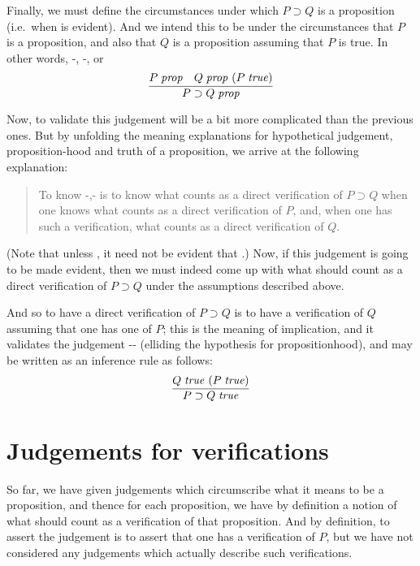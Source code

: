 \documentclass[main.tex]{subfiles}
\begin{document}
Finally, we must define the circumstances under which $P\supset Q$ is a
proposition (i.e.\ when  is evident). And we intend this to
be under the circumstances that $P$ is a proposition, and also that $Q$ is a
proposition assuming that $P$ is true. In other words, \hyp{}{, \hyp{}{}}, or
\[
  \infer{
    \isprop{P\supset Q}
  }{
    \isprop{P} &
    \hyp{\isprop{Q}}{\istrue{P}}
  }
\]

Now, to validate this judgement will be a bit more complicated than the
previous ones. But by unfolding the meaning explanations for hypothetical
judgement, proposition-hood and truth of a proposition, we arrive at the
following explanation:
\begin{quote}
  To know \hyp{}{,\hyp{}{}} is
  to know what counts as a direct verification of $P\supset Q$ when one knows what
  counts as a direct verification of $P$, and, when one has such a verification, what
  counts as a direct verification of $Q$.
\end{quote}

(Note that unless , it need not be evident that .) Now, if
this judgement is going to be made evident, then we must indeed come up with
what should count as a direct verification of $P\supset Q$ under the
assumptions described above.

And so to have a direct verification of $P\supset Q$ is to have a
verification of $Q$ assuming that one has one of $P$; this is the meaning of
implication, and it validates the judgement \hyp{}{\hyp{}{}} (elliding the hypothesis for
propositionhood), and may be written as an inference rule as follows:
\[
  \infer{
    \istrue{P\supset Q}
  }{
    \hyp{\istrue{Q}}{\istrue{P}}
  }
\]

\section{Judgements for verifications}

So far, we have given judgements which circumscribe what it means to be a
proposition, and thence for each proposition, we have by definition a notion of
what should count as a verification of that proposition. And by definition, to
assert the judgement  is to assert that one has a verification of $P$,
but we have not considered any judgements which actually describe such
verifications.
\end{document}
